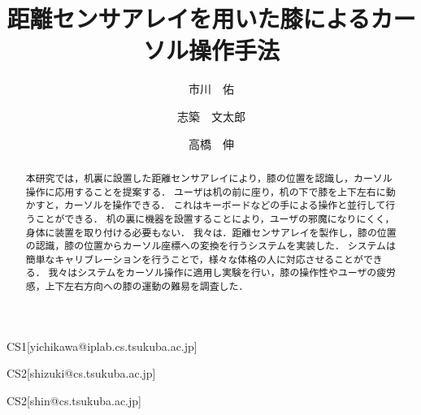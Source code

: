 \documentclass[submit, techrep]{ipsj}
\begin{document}
\title{距離センサアレイを用いた膝によるカーソル操作手法}






\author{市川　佑}{}{CS1}[yichikawa@iplab.cs.tsukuba.ac.jp]
\author{志築　文太郎}{}{CS2}[shizuki@cs.tsukuba.ac.jp]
\author{高橋　伸}{}{CS2}[shin@cs.tsukuba.ac.jp]

\begin{abstract}
本研究では，机裏に設置した距離センサアレイにより，膝の位置を認識し，カーソル操作に応用することを提案する．
ユーザは机の前に座り，机の下で膝を上下左右に動かすと，カーソルを操作できる．
これはキーボードなどの手による操作と並行して行うことができる．
机の裏に機器を設置することにより，ユーザの邪魔になりにくく，身体に装置を取り付ける必要もない．
我々は．距離センサアレイを製作し，膝の位置の認識，膝の位置からカーソル座標への変換を行うシステムを実装した．
システムは簡単なキャリブレーションを行うことで，様々な体格の人に対応させることができる．
我々はシステムをカーソル操作に適用し実験を行い，膝の操作性やユーザの疲労感，上下左右方向への膝の運動の難易を調査した．
\end{abstract}






\maketitle

\end{document}
